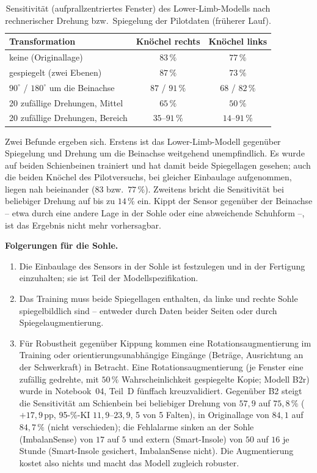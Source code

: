 \documentclass[11pt,a4paper,oneside]{report}
\begin{document}
\begin{table}[H]
\centering
\caption{Sensitivität (aufprallzentriertes Fenster) des Lower-Limb-Modells
         nach rechnerischer Drehung bzw.\ Spiegelung der Pilotdaten
         (früherer Lauf).}
\label{tab:fuss_orient}
\small
\begin{tabularx}{0.9\textwidth}{X c c}
\toprule
\textbf{Transformation} & \textbf{Knöchel rechts} & \textbf{Knöchel links} \\
\midrule
keine (Originallage)            & $83\,\%$ & $77\,\%$ \\
gespiegelt (zwei Ebenen)        & $87\,\%$ & $73\,\%$ \\
$90^{\circ}$ / $180^{\circ}$ um die Beinachse & $87$ / $91\,\%$ & $68$ / $82\,\%$ \\
20 zufällige Drehungen, Mittel  & $65\,\%$ & $50\,\%$ \\
20 zufällige Drehungen, Bereich & $35$--$91\,\%$ & $14$--$91\,\%$ \\
\bottomrule
\end{tabularx}
\end{table}

Zwei Befunde ergeben sich. Erstens ist das Lower-Limb-Modell gegenüber
Spiegelung und Drehung um die Beinachse weitgehend unempfindlich. Es
wurde auf beiden Schienbeinen trainiert und hat damit beide
Spiegellagen gesehen; auch die beiden Knöchel des Pilotversuchs, bei
gleicher Einbaulage aufgenommen, liegen nah beieinander ($83$ bzw.\
$77\,\%$). Zweitens bricht die Sensitivität bei beliebiger Drehung auf
bis zu $14\,\%$ ein. Kippt der Sensor gegenüber der Beinachse -- etwa
durch eine andere Lage in der Sohle oder eine abweichende Schuhform --,
ist das Ergebnis nicht mehr vorhersagbar.

\textbf{Folgerungen für die Sohle.}
\begin{enumerate}
\item Die Einbaulage des Sensors in der Sohle ist festzulegen und in
      der Fertigung einzuhalten; sie ist Teil der Modellspezifikation.
\item Das Training muss beide Spiegellagen enthalten, da linke und
      rechte Sohle spiegelbildlich sind -- entweder durch Daten beider
      Seiten oder durch Spiegelaugmentierung.
\item Für Robustheit gegenüber Kippung kommen eine
      Rotationsaugmentierung im Training oder orientierungsunabhängige
      Eingänge (Beträge, Ausrichtung an der Schwerkraft) in Betracht.
      Eine Rotationsaugmentierung (je Fenster eine zufällig gedrehte,
      mit $50\,\%$ Wahrscheinlichkeit gespiegelte Kopie; Modell B2r)
      wurde in Notebook~04, Teil~D fünffach kreuzvalidiert. Gegenüber
      B2 steigt die Sensitivität am Schienbein bei beliebiger Drehung
      von $57{,}9$ auf $75{,}8\,\%$ ($+17{,}9$\,pp, 95-\%-KI
      $11{,}9$--$23{,}9$, 5 von 5 Falten), in Originallage von $84{,}1$
      auf $84{,}7\,\%$ (nicht verschieden); die Fehlalarme sinken an der
      Sohle (ImbalanSense) von $17$ auf $5$ und extern (Smart-Insole)
      von $50$ auf $16$ je Stunde (Smart-Insole gesichert, ImbalanSense
      nicht). Die Augmentierung kostet also nichts und macht das Modell
      zugleich robuster.
\end{enumerate}
\end{document}
